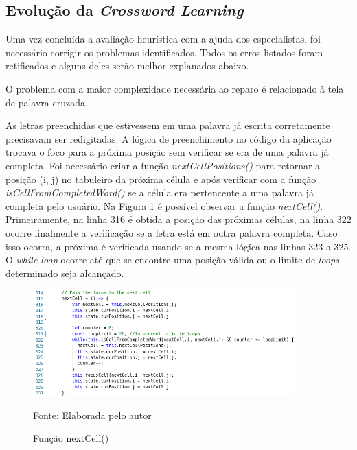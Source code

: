 \subsection{Evolução da \textit{Crossword Learning}}
Uma vez concluída a avaliação heurística com a ajuda dos especialistas, foi necessário corrigir os problemas identificados. Todos os erros listados foram retificados e alguns deles serão melhor explanados abaixo.

O problema com a maior complexidade necessária ao reparo é relacionado à tela de palavra cruzada. 

As letras preenchidas que estivessem em uma palavra já escrita corretamente precisavam ser redigitadas. A lógica de preenchimento no código da aplicação trocava o foco para a próxima posição sem verificar se era de uma palavra já completa. Foi necessário criar a função \textit{nextCellPositions()} para retornar a posição (i, j) no tabuleiro da próxima célula e após verificar com a função \textit{isCellFromCompletedWord()} se a célula era pertencente a uma palavra já completa pelo usuário. Na Figura \ref{fig:nextcell} é possível observar a função \textit{nextCell()}. Primeiramente, na linha 316 é obtida a posição das próximas células, na linha 322 ocorre finalmente a verificação se a letra está em outra palavra completa. Caso isso ocorra, a próxima é verificada usando-se a mesma lógica nas linhas 323 a 325. O \textit{while loop} ocorre até que se encontre uma posição válida ou o limite de \textit{loops} determinado seja alcançado.

\begin{figure}[H]
\centering
    \caption{Função nextCell()}
    \label{fig:nextcell}
    \includegraphics[width=0.9\textwidth]{Figuras/codeNextCell.png}
    
    Fonte: Elaborada pelo autor
\end{figure}



